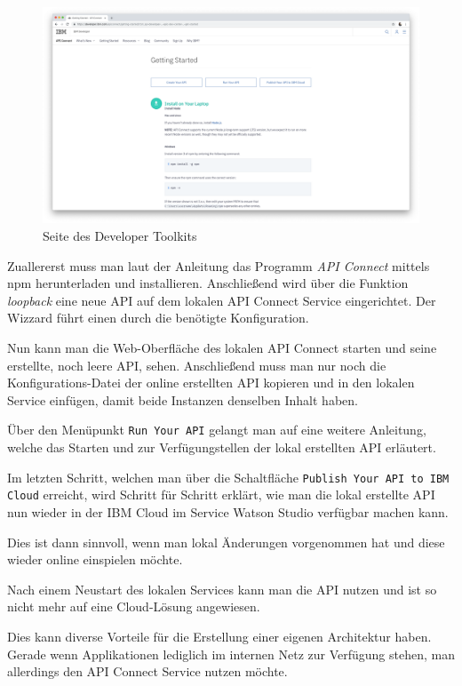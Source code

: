 \begin{figure}[h]
    \centering
    \includegraphics[width=\textwidth]{images/kapitel_3/developer_toolkit.png}
    \caption{Seite des Developer Toolkits}
    \label{fig:umsetzung_developer_toolkit}
\end{figure}

Zuallererst muss man laut der Anleitung das Programm \textit{API Connect} mittels npm herunterladen und installieren.
Anschließend wird über die Funktion \textit{loopback} eine neue API auf dem lokalen API Connect Service eingerichtet.
Der Wizzard führt einen durch die benötigte Konfiguration.

Nun kann man die Web-Oberfläche des lokalen API Connect starten und seine erstellte, noch leere API, sehen. Anschließend
muss man nur noch die Konfigurations-Datei der online erstellten API kopieren und in den lokalen Service einfügen, damit
beide Instanzen denselben Inhalt haben.

Über den Menüpunkt \texttt{Run Your API} gelangt man auf eine weitere Anleitung, welche das Starten und zur
Verfügungstellen der lokal erstellten API erläutert.

Im letzten Schritt, welchen man über die Schaltfläche \texttt{Publish Your API to IBM Cloud} erreicht, wird Schritt für
Schritt erklärt, wie man die lokal erstellte API nun wieder in der IBM Cloud im Service Watson Studio verfügbar machen
kann.

Dies ist dann sinnvoll, wenn man lokal Änderungen vorgenommen hat und diese wieder online einspielen möchte.

Nach einem Neustart des lokalen Services kann man die API nutzen und ist so nicht mehr auf eine Cloud-Lösung angewiesen.

Dies kann diverse Vorteile für die Erstellung einer eigenen Architektur haben. Gerade wenn Applikationen lediglich im
internen Netz zur Verfügung stehen, man allerdings den API Connect Service nutzen möchte.

